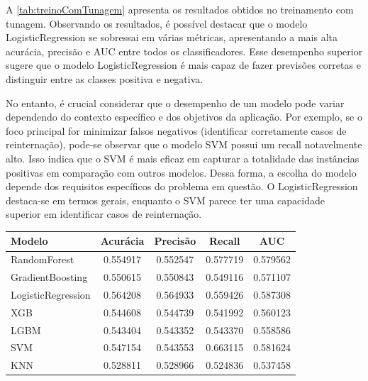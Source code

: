 A \autoref{tab:treinoComTunagem} apresenta os resultados obtidos no treinamento com tunagem. Observando os resultados, é possível destacar que o modelo LogisticRegression se sobressai em várias métricas, apresentando a mais alta acurácia, precisão e AUC entre todos os classificadores. Esse desempenho superior sugere que o modelo LogisticRegression é mais capaz de fazer previsões corretas e distinguir entre as classes positiva e negativa.

No entanto, é crucial considerar que o desempenho de um modelo pode variar dependendo do contexto específico e dos objetivos da aplicação. Por exemplo, se o foco principal for minimizar falsos negativos (identificar corretamente casos de reinternação), pode-se observar que o modelo SVM possui um recall notavelmente alto. Isso indica que o SVM é mais eficaz em capturar a totalidade das instâncias positivas em comparação com outros modelos. Dessa forma, a escolha do  modelo depende dos requisitos específicos do problema em questão. O LogisticRegression destaca-se em termos gerais, enquanto o SVM parece ter uma capacidade superior em identificar casos de reinternação.

\begin{table}[H]
	{
		\begin{tabular}{lcccc}
			\toprule
			\textbf{Modelo} & \textbf{Acurácia} & \textbf{Precisão} & \textbf{Recall} & \textbf{AUC} \\
			\midrule \midrule
			RandomForest & 0.554917 & 0.552547 & 0.577719 & 0.579562 \\
			\midrule
			GradientBoosting & 0.550615 & 0.550843 & 0.549116 & 0.571107 \\
			\midrule
			LogisticRegression & 0.564208 & 0.564933 & 0.559426 & 0.587308 \\
			\midrule
			XGB & 0.544608 & 0.544739 & 0.541992 & 0.560123 \\
			\midrule
			LGBM & 0.543404 & 0.543352 & 0.543370 & 0.558586 \\
			\midrule
			SVM & 0.547154 & 0.543553 & 0.663115 & 0.581624 \\
			\midrule
			KNN & 0.528811 & 0.528966 & 0.524836 & 0.537458 \\
			\bottomrule
		\end{tabular}
	}
	{
	}
\end{table}

